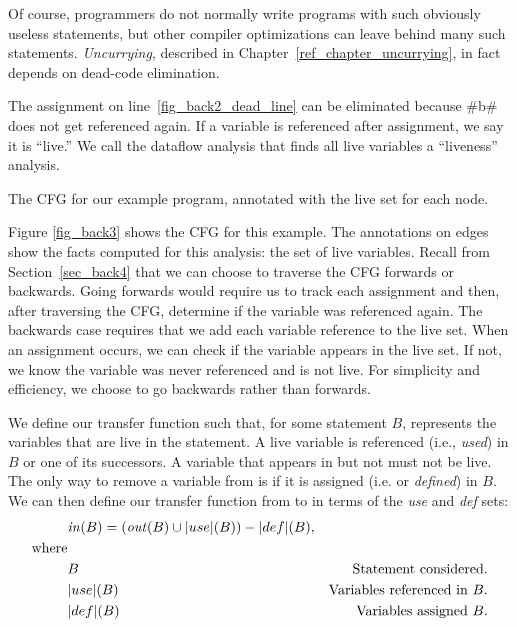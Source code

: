 \documentclass[12pt]{report}
\begin{document}
Of course, programmers do not normally write programs with such
obviously useless statements, but other compiler optimizations can
leave behind many such statements. \emph{Uncurrying}, described in
Chapter~\ref{ref_chapter_uncurrying}, in fact depends on dead-code
elimination.

The assignment on line~\ref{fig_back2_dead_line} can be eliminated
because #b# does not get referenced again. If a variable is referenced
after assignment, we say it is ``live.'' We call the dataflow
analysis that finds all live variables a ``liveness'' analysis. 

\begin{myfig}[th]
\begin{minipage}{2in}

\end{minipage}
\caption{The CFG for our example program, annotated with the live
set for each node.}
\label{fig_back3}
\end{myfig}

Figure \ref{fig_back3} shows the CFG for this example. The annotations
on edges show the facts computed for this analysis: the set of live
variables. Recall from Section~\ref{sec_back4} that we can choose to
traverse the CFG forwards or backwards. Going forwards would require
us to track each assignment and then, after traversing the CFG,
determine if the variable was referenced again. The backwards case
requires that we add each variable reference to the live set. When an
assignment occurs, we can check if the variable appears in the live
set. If not, we know the variable was never referenced and is not
live. For simplicity and efficiency, we choose to go backwards rather
than forwards.

We define our transfer function such that, for some statement $B$,
\inBa represents the variables that are live in the statement. A live
variable is referenced (i.e., \emph{used}) in $B$ or one
of its successors. A variable that appears in \outBa but not \inBa must
not be live. The only way to remove a variable from \outBa is if it is 
assigned (i.e. or \emph{defined}) in $B$. We can then define our transfer
function from \outBa to \inBa in terms of the \emph{use} and \emph{def} sets:
\begin{align}
  & \mathit{in}(B) = (\mathit{out}(B) \cup |use|(B)) - |def|(B), \label{eqn_back1} \\
\text{where} \notag\\
  & B     & \text{Statement considered.} \notag\\
  & |use|(B) & \text{Variables referenced in $B$}. \notag\\
  & |def|(B) & \text{Variables assigned $B$}. \notag\\
\end{align}
\end{document}
